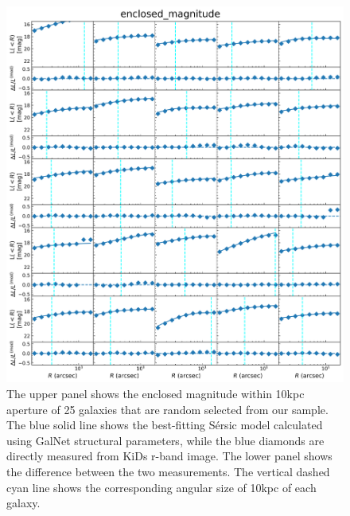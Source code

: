 \documentclass[fleqn,usenatbib]{mnras}
\begin{document}
\begin{figure}
    \centering
    \includegraphics[width=0.8\linewidth]{figure/enclosed_mag.png}
    \caption{The upper panel shows the enclosed magnitude within 10kpc aperture of 25 galaxies that are random selected from our sample. The blue solid line shows the best-fitting S\'{e}rsic model calculated using GalNet structural parameters, while the blue diamonds are directly measured from KiDs r-band image. The lower panel shows the difference between the two measurements. The vertical dashed cyan line shows the corresponding angular size of 10kpc of each galaxy.} 
    \label{fig:enclosed_magnitude}
\end{figure}
\end{document}
